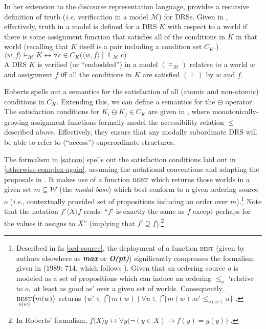 In her extension to the discourse representation language, \citet[714-5]{Roberts1989} provides a recursive definition of truth (\textit{i.e.} verification in a model $ \mathcal  M $) for DRSs. Given in \nextx, effectively, truth in a model is defined for a DRS $ K $ with respect to a world if there is some assignment function that satisfies all of the conditions in $ K $ in that world (recalling that $ K $ itself is a pair including a condition set $ C_K $.)
\ex $ \langle w,f\rangle \vDash_\mathcal M K\leftrightarrow \forall c\in C_K\big(\langle w,f\rangle\mid\Vdash_\mathcal M c\big)$\\
A DRS $ K $ is verified (or ``embedded'') in a model $( \vDash_\mathcal M )$ relative to a world $ w $ and assignment $ f $ iff all the conditions in $ K $ are satisfied $( \Vdash) $ by $ w $ and $ f $.
\xe%


Roberts spells out a semantics for the satisfaction of all (atomic and non-atomic) conditions in  $ C_K $. Extending this, we can define a semantics for the $ \ominus $ operator. The satisfaction conditions for $ K_i\ominus K_j\in C_K $ are given in \nextx, where monotonically-growing assignment functions formally model the accessibility relation $ \leqslant $ described above. Effectively, they ensure that any modally subordinate DRS will be able to refer to (``access'') superordinate structures. 

The formalism in \ref{satcon} spells out the satisfaction conditions laid out in \ref{otherwise-complex-again}, assuming the notational conventions and adapting the proposals in \citet[714]{Roberts1989}. It makes use of a function $ \textsc{best} $ which returns those worlds in a given set $ m\subseteq\mathcal W $ (the \textit{modal base}) which best conform to a given ordering source $ o $ (\textit{i.e.}, contextually provided set of propositions inducing an order over $ m $).\footnote{Described in fn \ref{ord-source}, the deployment of a function \textsc{best} (given by authors elsewhere as \textbf{\textit{max}} or \textbf{\textit{O(pt)}}) significantly compresses the formalism given in \citeauthor{Roberts1989} (1989: 714, which follows \citealp{Kratzer1981}). Given that an ordering source $ o $ is modeled as a set of propositions which can induce an ordering $ \leq_o $ `relative to $ o, $ at least as good as' over a given set of worlds. Consequently, $ \underset{o(w)}{\textsc{best}}\big(m(w)\big) $ returns $ \{w'\in\bigcap m(w)\mid \forall u\in\bigcap m(w).w'\leq_{o(w)} u \} $ \citep[see][]{Hacquard2006, Schwager2006}.}
Note that the notation $ f'\!{\scriptscriptstyle\langle X\rangle}f$ reads: ``$ f' $ is exactly the same as $ f $ except perhaps for the values it assigns to $ X $'' (implying that $ f' \supseteq f$).\footnote{In Roberts' formalism, $ f\!{\scriptscriptstyle\langle X\rangle}g\leftrightarrow \forall y\big(\neg(y\in X)\to f(y)=g(y)\big) $ \citeyearpar[714]{Roberts1989}.}

